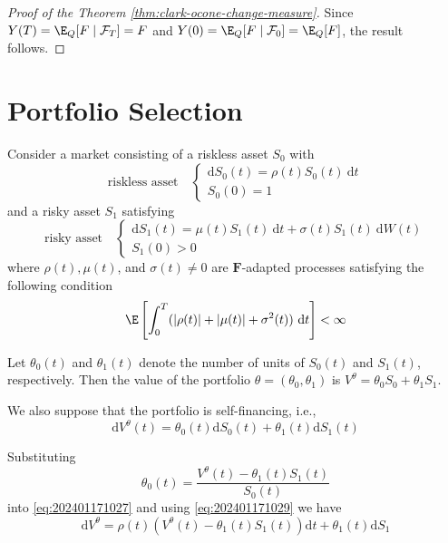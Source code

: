 \begin{proof}[Proof of the Theorem \ref{thm:clark-ocone-change-measure}]
Since $Y(T) = \E_Q [F \mid \mathcal{F}_T] = F$ and $Y(0) = \E_Q [F \mid \mathcal{F}_0] = \E_Q [F]$, the result follows.

\end{proof}

\section{Portfolio Selection}\label{portfolio-selection}

Consider a market consisting of a riskless asset $S_0$ with
\begin{equation}\label{eq:202401171029}
\text{riskless asset} \quad \begin{cases}
	\mathrm{d}S_0(t) = \rho(t) S_0(t)~\mathrm{d}t \\
	S_0(0) = 1
\end{cases}
\end{equation}
and a risky asset $S_1$ satisfying
\begin{equation}\label{eq:202401171030}
\text{risky asset} \quad \begin{cases}
	\mathrm{d}S_1(t) = \mu(t) S_1(t)~\mathrm{d}t + \sigma(t) S_1(t)~\mathrm{d}W(t) \\
	S_1(0) > 0 
\end{cases}
\end{equation}
where $\rho(t), \mu(t)$, and $\sigma(t) \neq 0$ are $\mathbf{F}$-adapted processes satisfying the following condition
\[
\E \left[ \int_0^T (|\rho(t)| + |\mu(t)| + \sigma^2(t)) ~\mathrm{d}t \right] < \infty
\]

Let $\theta_0(t)$ and $\theta_1(t)$ denote the number of units of $S_0(t)$ and $S_1(t)$, respectively. Then the value of the portfolio $\theta = (\theta_0, \theta_1)$ is $V^\theta = \theta_0 S_0 + \theta_1 S_1$.

We also suppose that the portfolio is self-financing, i.e.,
\begin{equation}\label{eq:202401171027}
\mathrm{d} V^\theta(t) = \theta_0 (t) \mathrm{d} S_0(t) + \theta_1 (t) \mathrm{d} S_1(t)
\end{equation}

Substituting  
\begin{equation*}
\theta_0(t) = \frac{V^\theta(t) - \theta_1(t) S_1(t)}{S_0(t)}
\end{equation*}
into \eqref{eq:202401171027} and using \eqref{eq:202401171029} we have
\begin{equation}\label{eq:202401171031}
\mathrm{d} V^\theta = \rho(t)(V^\theta(t) - \theta_1(t) S_1(t)) \mathrm{d} t + \theta_1(t) \mathrm{d} S_1
\end{equation}

